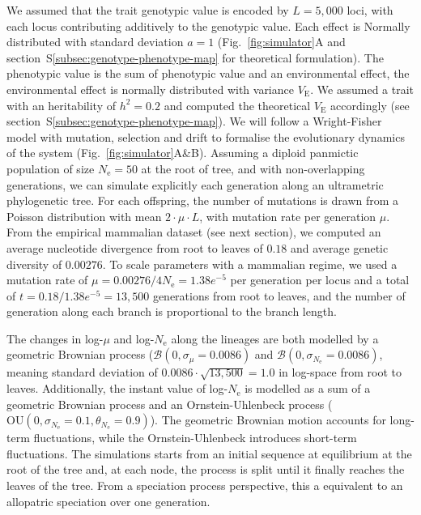 \documentclass{article}
\newcommand{\Multiply}{\cdot}
\newcommand{\Ne}{N_{\text{e}}}
\newcommand{\Time}{t}
\newcommand{\Heritability}{h^2}
\newcommand{\MutationRate}{\mu}
\newcommand{\NbrLoci}{L}
\newcommand{\VarEnv}{V_{\mathrm{E}}}
\newcommand{\brownian}{\mathcal{B}}
\begin{document}
We assumed that the trait genotypic value is encoded by $\NbrLoci=5,000$ loci, with each locus contributing additively to the genotypic value.
Each effect is Normally distributed with standard deviation $a=1$ (Fig.~\ref{fig:simulator}A and section~S\ref{subsec:genotype-phenotype-map} for theoretical formulation).
The phenotypic value is the sum of phenotypic value and an environmental effect, the environmental effect is normally distributed with variance $\VarEnv$.
We assumed a trait with an heritability of $\Heritability =0.2$ and computed the theoretical $\VarEnv$ accordingly (see section~S\ref{subsec:genotype-phenotype-map}).
We will follow a Wright-Fisher model with mutation, selection and drift to formalise the evolutionary dynamics of the system (Fig.~\ref{fig:simulator}A\&B).
Assuming a diploid panmictic population of size $\Ne=50$ at the root of tree, and with non-overlapping generations, we can simulate explicitly each generation along an ultrametric phylogenetic tree.
For each offspring, the number of mutations is drawn from a Poisson distribution with mean $2 \Multiply \MutationRate \Multiply \NbrLoci $, with mutation rate per generation $\MutationRate$.
From the empirical mammalian dataset (see next section), we computed an average nucleotide divergence from root to leaves of $0.18$ and average genetic diversity of $0.00276$.
To scale parameters with a mammalian regime, we used a mutation rate of $\MutationRate=0.00276 / 4 \Ne = 1.38e^{-5}$ per generation per locus and a total of $\Time = 0.18 / 1.38e^{-5} = 13,500$ generations from root to leaves, and the number of generation along each branch is proportional to the branch length.

The changes in log-$\MutationRate$ and log-$\Ne$ along the lineages are both modelled by a geometric Brownian process ($\brownian \left(0, \sigma_{\MutationRate}=0.0086\right)$ and $\brownian \left(0, \sigma_{\Ne}=0.0086\right)$, meaning standard deviation of $0.0086 \Multiply \sqrt {13,500} = 1.0$ in log-space from root to leaves.
Additionally, the instant value of log-$\Ne$ is modelled as a sum of a geometric Brownian process and an Ornstein-Uhlenbeck process ($\text{OU} \left(0, \sigma_{\Ne}=0.1, \theta_{\Ne}=0.9\right)$).
The geometric Brownian motion accounts for long-term fluctuations, while the Ornstein-Uhlenbeck introduces short-term fluctuations.
The simulations starts from an initial sequence at equilibrium at the root of the tree and, at each node, the process is split until it finally reaches the leaves of the tree.
From a speciation process perspective, this a equivalent to an allopatric speciation over one generation.
\end{document}
